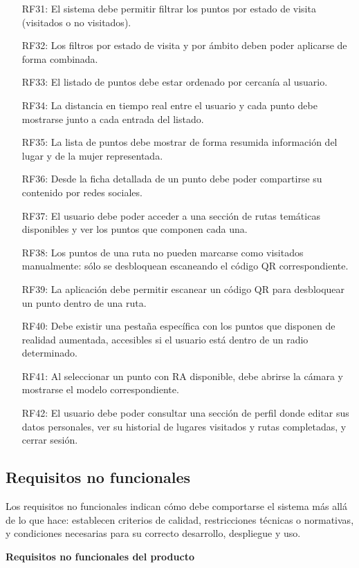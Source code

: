 \begin{itemize}
\item[RF31:] El sistema debe permitir filtrar los puntos por estado de visita (visitados o no visitados).
\item[RF32:] Los filtros por estado de visita y por ámbito deben poder aplicarse de forma combinada.
\item[RF33:] El listado de puntos debe estar ordenado por cercanía al usuario.
\item[RF34:] La distancia en tiempo real entre el usuario y cada punto debe mostrarse junto a cada entrada del listado.
\item[RF35:] La lista de puntos debe mostrar de forma resumida información del lugar y de la mujer representada.
\item[RF36:] Desde la ficha detallada de un punto debe poder compartirse su contenido por redes sociales.
\item[RF37:] El usuario debe poder acceder a una sección de rutas temáticas disponibles y ver los puntos que componen cada una.
\item[RF38:] Los puntos de una ruta no pueden marcarse como visitados manualmente: sólo se desbloquean escaneando el código QR correspondiente.
\item[RF39:] La aplicación debe permitir escanear un código QR para desbloquear un punto dentro de una ruta.
\item[RF40:] Debe existir una pestaña específica con los puntos que disponen de realidad aumentada, accesibles si el usuario está dentro de un radio determinado.
\item[RF41:] Al seleccionar un punto con RA disponible, debe abrirse la cámara y mostrarse el modelo correspondiente.
\item[RF42:] El usuario debe poder consultar una sección de perfil donde editar sus datos personales, ver su historial de lugares visitados y rutas completadas, y cerrar sesión.

\end{itemize}

\subsection{Requisitos no funcionales}
Los requisitos no funcionales indican cómo debe comportarse el sistema más allá de lo que hace: establecen criterios de calidad, restricciones técnicas o normativas, y condiciones necesarias para su correcto desarrollo, despliegue y uso.

\textbf{Requisitos no funcionales del producto}


